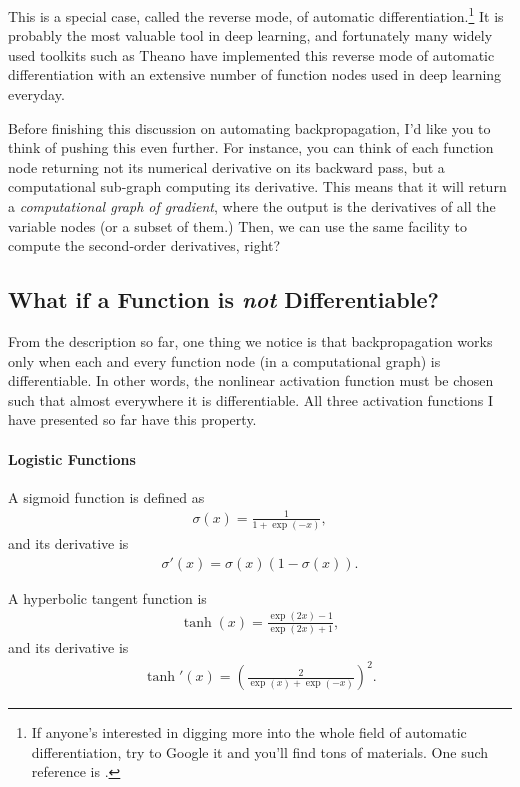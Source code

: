 \documentclass{report}
\begin{document}
This is a special case, called the reverse mode, of automatic
differentiation.\footnote{
    If anyone's interested in digging more into the whole field of automatic
    differentiation, try to Google it and you'll find tons of materials. One
    such reference is \citet{baydin2015automatic}.
} It is probably the most valuable tool in deep learning, and fortunately many
widely used toolkits such as Theano \citep{bergstra2010theano,bastien2012theano}
have implemented this reverse mode of automatic differentiation with an
extensive number of function nodes used in deep learning everyday.

Before finishing this discussion on automating backpropagation, I'd like you to
think of pushing this even further. For instance, you can think of each function
node returning not its numerical derivative on its backward pass, but a
computational sub-graph computing its derivative. This means that it will return
a {\em computational graph of gradient}, where the output is the derivatives of
all the variable nodes (or a subset of them.) Then, we can use the same facility
to compute the second-order derivatives, right? 

\subsection{What if a Function is {\em not} Differentiable?}
\label{sec:nonlinearities}

From the description so far, one thing we notice is that backpropagation works
only when each and every function node (in a computational graph) is
differentiable. In other words, the nonlinear activation function must be chosen
such that almost everywhere it is differentiable. All three activation functions
I have presented so far have this property.

\paragraph{Logistic Functions}
A sigmoid function is defined as
\begin{align*}
    \sigma(x) = \frac{1}{1+\exp(-x)},
\end{align*}
and its derivative is
\begin{align*}
    \sigma'(x) = \sigma(x) (1 - \sigma(x)).
\end{align*}

A hyperbolic tangent function is
\begin{align*}
    \tanh(x) =  \frac{\exp(2x) -1}{\exp(2x) + 1},
\end{align*}
and its derivative is 
\begin{align*}
    \tanh'(x) = \left(\frac{2}{\exp(x)+\exp(-x)}\right)^2.
\end{align*}
\end{document}
